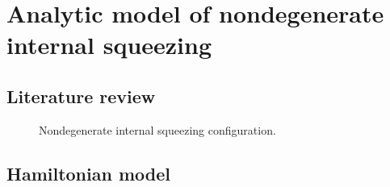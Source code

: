 \chapter{Analytic model of nondegenerate internal squeezing} %
\label{chp:nIS_analytics}











\section{Literature review}






\begin{figure}
	\centering
	\caption{Nondegenerate internal squeezing configuration.}
	\label{fig:}
\end{figure}

\section{Hamiltonian model}

